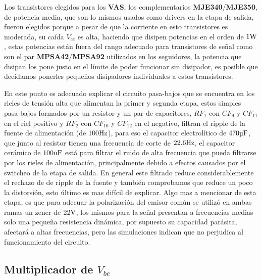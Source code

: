 Los transistores elegidos para los \textbf{VAS}, los complementarios \textbf{MJE340}/\textbf{MJE350}, de potencia media, que son lo mismos usados como drivers en la etapa de salida, fueron elegidos porque a pesar de que la corriente en esto transistores es moderada, su caída $V_{ce}$ es alta, haciendo que disipen potencias en el orden de $1 \si[per-mode=symbol]{\watt}$, estas potencias están fuera del rango adecuado para transistores de señal como son el par \textbf{MPSA42}/\textbf{MPSA92} utilizados en los seguidores, la potencia que disipan los pone justo en el límite de poder funcionar sin disipador, es posible que decidamos ponerles pequeños disipadores individuales a estos transistores.


En este punto es adecuado explicar el circuito pasa-bajos que se encuentra en los rieles de tensión alta que alimentan la primer y segunda etapa, estos simples pasa-bajos formados por un resistor y un par de capacitores, $RF_{1}$ con $CF_{9}$ y $CF_{11}$ en el riel positivo y $RF_{2}$ con $CF_{10}$ y $CF_{12}$ en el negativo, filtran el ripple de la fuente de alimentación (de $100 \si[per-mode=symbol]{\hertz}$), para eso el capacitor electrolítico de $470 \si[per-mode=symbol]{\micro\farad}$, que junto al resistor tienen una frecuencia de corte de $22.6 \si[per-mode=symbol]{\hertz}$, el capacitor cerámico de $100 \si[per-mode=symbol]{\nano\farad}$ está para filtrar el ruido de alta frecuencia que pueda filtrarse por los rieles de alimentación, principalmente debido a efectos causados por el switcheo de la etapa de salida. En general este filtrado reduce considerablemente el rechazo de de ripple de la fuente y también comprobamos que reduce un poco la distorsión, esto último es mas difícil de explicar.
Algo mas a mencionar de esta etapa, es que para adecuar la polarización del emisor común se utilizó en ambas ramas un zener de $22 \si[per-mode=symbol]{\volt}$, los mismos para la señal presentan a frecuencias medias solo una pequeña resistencia dinámica, por supuesto su capacidad parásita, afectará a altas frecuencias, pero las simulaciones indican que no perjudica al funcionamiento del circuito.

\clearpage


\subsection{Multiplicador de $V_{be}$}


